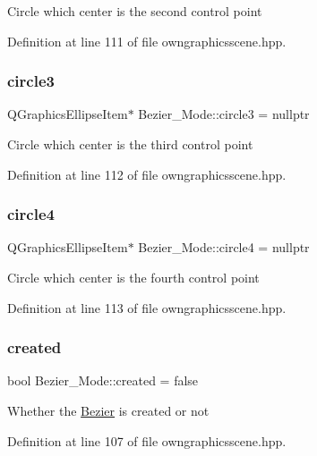 Circle which center is the second control point 

Definition at line 111 of file owngraphicsscene.\+hpp.

\mbox{\label{structBezier__Mode_a342d3b970c6049b615ef356a902c0781}} 
\subsubsection{\texorpdfstring{circle3}{circle3}}
{\footnotesize\ttfamily Q\+Graphics\+Ellipse\+Item$\ast$ Bezier\+\_\+\+Mode\+::circle3 = nullptr}

Circle which center is the third control point 

Definition at line 112 of file owngraphicsscene.\+hpp.

\mbox{\label{structBezier__Mode_a6f26e1fe7da425063b792dab9f3c1099}} 
\subsubsection{\texorpdfstring{circle4}{circle4}}
{\footnotesize\ttfamily Q\+Graphics\+Ellipse\+Item$\ast$ Bezier\+\_\+\+Mode\+::circle4 = nullptr}

Circle which center is the fourth control point 

Definition at line 113 of file owngraphicsscene.\+hpp.

\mbox{\label{structBezier__Mode_ae2573f8601e7d9f439d2bfbc11c34ae9}} 
\subsubsection{\texorpdfstring{created}{created}}
{\footnotesize\ttfamily bool Bezier\+\_\+\+Mode\+::created = false}

Whether the \mbox{\hyperlink{classBezier}{Bezier}} is created or not 

Definition at line 107 of file owngraphicsscene.\+hpp.

\mbox{\label{structBezier__Mode_afdb33ea2b7dc22c264580b86e5e9e998}} 
